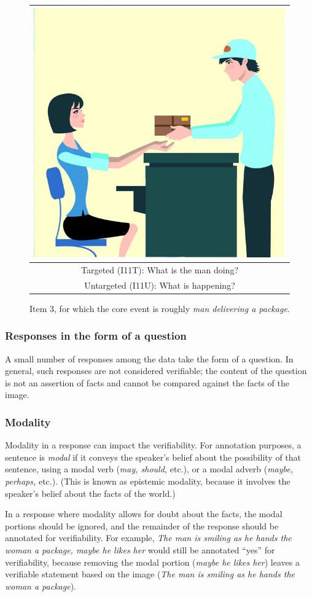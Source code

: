 \documentclass[12pt,notitlepage]{article}
\begin{document}
\begin{figure}[h]
\begin{center}
\begin{tabular}{|c|}
\hline
\includegraphics[width=0.4\columnwidth,trim=0 0 0 -3]{figures/I03.jpg}\\
\hline
Targeted (I11T): What is the man doing?\\
\hline
Untargeted (I11U): What is happening? \\
\hline
\end{tabular}
\end{center}
\caption{Item 3, for which the core event is roughly \textit{man delivering a package}.}
\label{fig:deliver-package}
\end{figure}

\subsubsection{Responses in the form of a question} \label{subsubsec:verif-question} A small number of responses among the data take the form of a question. In general, such responses are not considered verifiable; the content of the question is not an assertion of facts and cannot be compared against the facts of the image. 

\subsubsection{Modality} Modality in a response can impact the verifiability. For annotation purposes, a sentence is \textit{modal} if it conveys the speaker's belief about the possibility of that sentence, using a modal verb (\textit{may, should,} etc.), or a modal adverb (\textit{maybe, perhaps,} etc.). (This is known as epistemic modality, because it involves the speaker's belief about the facts of the world.)

In a response where modality allows for doubt about the facts, the modal portions should be ignored, and the remainder of the response should be annotated for verifiability. For example, \textit{The man is smiling as he hands the woman a package, maybe he likes her} would still be annotated ``yes'' for verifiability, because removing the modal portion (\textit{maybe he likes her}) leaves a verifiable statement based on the image (\textit{The man is smiling as he hands the woman a package}).
\end{document}

